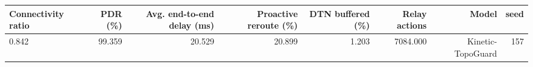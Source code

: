 \begin{tabular}{lrrrrrrr}
\toprule
Connectivity ratio & PDR (\%) & Avg. end-to-end delay (ms) & Proactive reroute (\%) & DTN buffered (\%) & Relay actions & Model & seed \\
\midrule
0.842 & 99.359 & 20.529 & 20.899 & 1.203 & 7084.000 & Kinetic-TopoGuard & 157 \\
\bottomrule
\end{tabular}